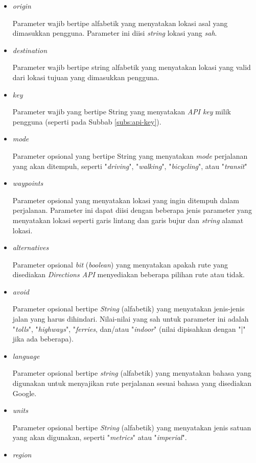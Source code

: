 \begin{itemize}
	\item \textit{origin}
	
	Parameter wajib bertipe alfabetik yang menyatakan lokasi asal yang dimasukkan pengguna. Parameter ini diisi \textit{string} lokasi yang \textit{sah}.
	\item \textit{destination}
	
	Parameter wajib bertipe string alfabetik yang menyatakan lokasi yang valid dari lokasi tujuan yang dimasukkan pengguna.
	\item \textit{key}
	
	Parameter wajib yang bertipe String yang menyatakan \textit{API key} milik pengguna (seperti pada Subbab \ref{subs:api-key}).
	\item \textit{mode}
	
	Parameter opsional yang bertipe String yang menyatakan \textit{mode} perjalanan yang akan ditempuh, seperti "\textit{driving}", "\textit{walking}", "\textit{bicycling}", atau "\textit{transit}"
	\item \textit{waypoints}
	
	Parameter opsional yang menyatakan lokasi yang ingin ditempuh dalam perjalanan. Parameter ini dapat diisi dengan beberapa jenis parameter yang menyatakan lokasi seperti garis lintang dan garis bujur dan \textit{string} alamat lokasi.
	\item \textit{alternatives}
	
	Parameter opsional \textit{bit} (\textit{boolean}) yang menyatakan apakah rute yang disediakan \textit{Directions API} menyediakan beberapa pilihan rute atau tidak. 
	\item \textit{avoid}
	
	Parameter opsional bertipe \textit{String} (alfabetik) yang menyatakan jenis-jenis jalan yang harus dihindari. Nilai-nilai yang sah untuk parameter ini adalah "\textit{tolls}", "\textit{highways}", "\textit{ferries}, dan/atau "\textit{indoor}" (nilai dipisahkan dengan "|" jika ada beberapa).
	\item \textit{language}
	
	Parameter opsional bertipe \textit{string} (alfabetik) yang menyatakan bahasa yang digunakan untuk menyajikan rute perjalanan sesuai bahasa yang disediakan Google. 
	\item \textit{units}
	
	Parameter opsional bertipe \textit{String} (alfabetik) yang menyatakan jenis satuan yang akan digunakan, seperti "\textit{metrics}" atau "\textit{imperial}".
	\item \textit{region}
	

\end{itemize}
